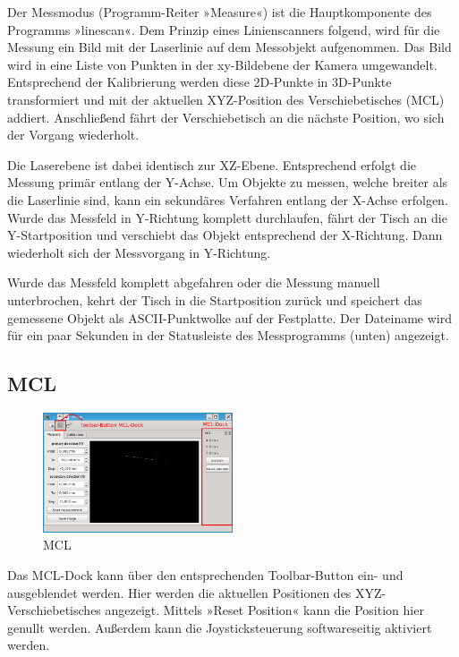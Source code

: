 \documentclass[a4paper,10pt]{scrartcl}
\begin{document}
Der Messmodus (Programm-Reiter »Measure«) ist die Hauptkomponente des Programms »linescan«.
Dem Prinzip eines Linienscanners folgend,
wird für die Messung ein Bild mit der Laserlinie auf dem Messobjekt aufgenommen. Das Bild wird
in eine Liste von Punkten in der xy-Bildebene der Kamera umgewandelt. Entsprechend der Kalibrierung
werden diese 2D-Punkte in 3D-Punkte transformiert und mit der aktuellen XYZ-Position des
Verschiebetisches (MCL) addiert. Anschließend fährt der Verschiebetisch an die nächste Position,
wo sich der Vorgang wiederholt.

Die Laserebene ist dabei identisch zur XZ-Ebene. Entsprechend erfolgt die Messung primär entlang
der Y-Achse. Um Objekte zu messen, welche breiter als die Laserlinie sind, kann ein sekundäres
Verfahren entlang der X-Achse erfolgen. Wurde das Messfeld in Y-Richtung komplett durchlaufen,
fährt der Tisch an die Y-Startposition und verschiebt das Objekt entsprechend der X-Richtung.
Dann wiederholt sich der Messvorgang in Y-Richtung.

Wurde das Messfeld komplett abgefahren oder die Messung manuell unterbrochen, kehrt der Tisch
in die Startposition zurück und speichert das gemessene Objekt als ASCII-Punktwolke auf der
Festplatte. Der Dateiname wird für ein paar Sekunden in der Statusleiste des Messprogramms
(unten) angezeigt.

\subsection{MCL}

\begin{figure}[H]
  \centering
  \includegraphics[width=0.5\textwidth]{include/mcl.png}
  \caption{MCL}
  \label{fig:MCL-Dock}
\end{figure}

Das MCL-Dock kann über den entsprechenden Toolbar-Button ein- und ausgeblendet werden.
Hier werden die aktuellen Positionen des XYZ-Verschiebetisches angezeigt. Mittels »Reset Position« kann die Position
hier genullt werden. Außerdem kann die Joysticksteuerung softwareseitig aktiviert werden.
\end{document}
